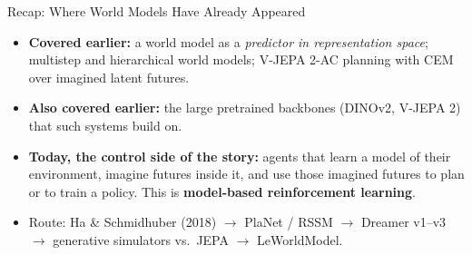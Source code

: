 \begin{frame}{Recap: Where World Models Have Already Appeared}
  \begin{itemize}\itemsep0.3em
    \item \textbf{Covered earlier:} a world model as a \emph{predictor in representation space}; multistep and hierarchical world models; V-JEPA 2-AC planning with CEM over imagined latent futures.
    \item \textbf{Also covered earlier:} the large pretrained backbones (DINOv2, V-JEPA 2) that such systems build on.
    \item \textbf{Today, the control side of the story:} agents that learn a model of their environment, imagine futures inside it, and use those imagined futures to plan or to train a policy. This is \textbf{model-based reinforcement learning}.
    \item Route: Ha \& Schmidhuber (2018) $\rightarrow$ PlaNet / RSSM $\rightarrow$ Dreamer v1--v3 $\rightarrow$ generative simulators vs.\ JEPA $\rightarrow$ LeWorldModel.
  \end{itemize}
\end{frame}
